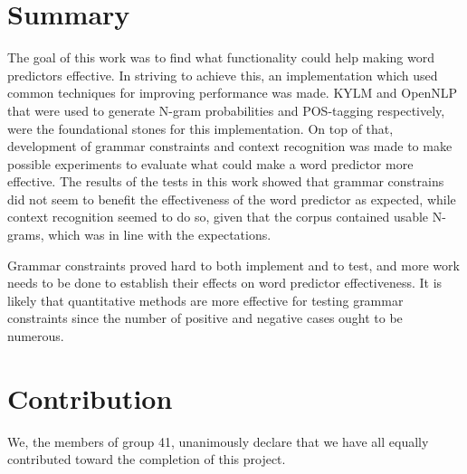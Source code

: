 \section{Summary}
The goal of this work was to find what functionality could help making word predictors effective. In striving to achieve this, an implementation which used common techniques for improving performance was made. KYLM and OpenNLP that were used to generate N-gram probabilities and POS-tagging respectively, were the foundational stones for this implementation. On top of that, development of grammar constraints and context recognition was made to make possible experiments to evaluate what could make a word predictor more effective. The results of the tests in this work showed that grammar constrains did not seem to benefit the effectiveness of the word predictor as expected, while context recognition seemed to do so, given that the corpus contained usable N-grams, which was in line with the expectations.

Grammar constraints proved hard to both implement and to test, and more work needs to be done to establish their effects on word predictor effectiveness. It is likely that quantitative methods are more effective for testing grammar constraints since the number of positive and negative cases ought to be numerous.

\section{Contribution}
We, the members of group 41, unanimously declare that we have all equally contributed toward the completion of this project.
